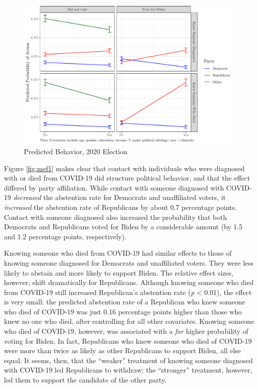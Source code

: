 \documentclass[
  12pt,
]{article}
\begin{document}
\begin{figure}[!htbp]

{\centering \includegraphics{theory_paper_files/figure-latex/mef1-c-1} 

}

\caption{\label{fig:mef1}Predicted Behavior, 2020 Election}\label{fig:mef1-c}
\end{figure}

Figure \ref{fig:mef1} makes clear that contact with individuals who were diagnosed with or died from COVID-19 did structure political behavior, and that the effect differed by party affiliation. While contact with someone diagnosed with COVID-19 \emph{decreased} the abstention rate for Democrats and unaffiliated voters, it \emph{increased} the abstention rate of Republicans by about 0.7 percentage points. Contact with someone diagnosed also increased the probability that both Democrats and Republicans voted for Biden by a considerable amount (by 1.5 and 1.2 percentage points, respectively).

Knowing someone who died from COVID-19 had similar effects to those of knowing someone diagnosed for Democrats and unaffiliated voters. They were less likely to abstain and more likely to support Biden. The relative effect sizes, however, shift dramatically for Republicans. Although knowing someone who died from COVID-19 still increased Republican's abstention rate (\emph{p} \textless{} 0.01), the effect is very small: the predicted abstention rate of a Republican who knew someone who died of COVID-19 was just 0.16 percentage points higher than those who knew no one who died, after controlling for all other covariates. Knowing someone who died of COVID-19, however, was associated with a \emph{far} higher probability of voting for Biden. In fact, Republicans who knew someone who died of COVID-19 were more than twice as likely as other Republicans to support Biden, all else equal. It seems, then, that the ``weaker'' treatment of knowing someone diagnosed with COVID-19 led Republicans to withdraw; the ``stronger'' treatment, however, led them to support the candidate of the other party.
\end{document}
